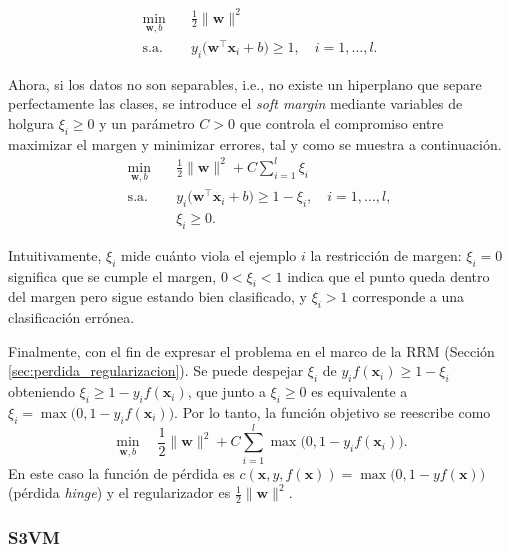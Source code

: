 \begin{equation}
\begin{aligned}
\min_{\mathbf{w},b} \quad & \frac{1}{2}\|\mathbf{w}\|^2 \\
\text{s.a.} \quad & y_i\bigl(\mathbf{w}^{\top}\mathbf{x}_i+b\bigr) \geq 1, \quad i=1,\dots,l.
\end{aligned}
\end{equation}

Ahora, si los datos no son separables, i.e., no existe un hiperplano que separe perfectamente las clases, se introduce el \textit{soft margin} mediante variables de holgura $\xi_i\ge 0$ y un parámetro $C>0$ que controla el compromiso entre maximizar el margen y minimizar errores, tal y como se muestra a continuación.
\begin{equation}
\begin{aligned}
\min_{\mathbf{w},b} \quad & \frac{1}{2}\|\mathbf{w}\|^2 + C \sum_{i=1}^l \xi_i \\
\text{s.a.} \quad & y_i\bigl(\mathbf{w}^{\top}\mathbf{x}_i+b\bigr) \geq 1 - \xi_i, \quad i=1,\dots,l, \\
                  & \xi_i \geq 0.
\end{aligned}
\end{equation}

Intuitivamente, $\xi_i$ mide cuánto viola el ejemplo $i$ la restricción de margen: $\xi_i=0$ significa que se cumple el margen, $0<\xi_i<1$ indica que el punto queda dentro del margen pero sigue estando bien clasificado, y $\xi_i>1$ corresponde a una clasificación errónea.  

Finalmente, con el fin de expresar el problema en el marco de la \gls{RRM} (Sección \ref{sec:perdida_regularizacion}). Se puede despejar $\xi_i$ de $y_i f(\mathbf{x}_i) \ge 1-\xi_i$ obteniendo $\xi_i\ge 1-y_if(\mathbf{x}_i)$, que junto a $\xi_i\ge 0$ es equivalente a $\xi_i=\max\bigl(0,1-y_if(\mathbf{x}_i)\bigr)$. Por lo tanto, la función objetivo se reescribe como
\begin{equation}
\min_{\mathbf{w},b} \quad \frac{1}{2}\|\mathbf{w}\|^2 + C \sum_{i=1}^l \max\bigl(0, 1 - y_i f(\mathbf{x}_i)\bigr).
\end{equation}
En este caso la función de pérdida es $c(\mathbf{x},y,f(\mathbf{x})) = \max\bigl(0, 1 - y f(\mathbf{x})\bigr)$ (pérdida \textit{hinge}) y el regularizador es $\frac{1}{2}\|\mathbf{w}\|^2$.

\subsubsection{S3VM}

